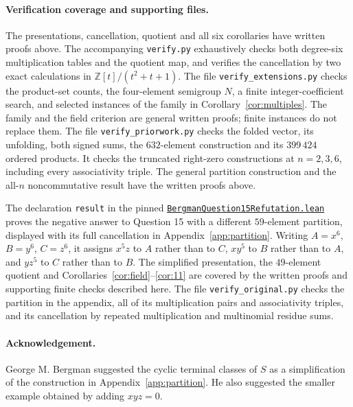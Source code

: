 \documentclass[11pt]{article}
\begin{document}
\paragraph{Verification coverage and supporting files.}
The presentations, cancellation, quotient and all six corollaries have
written proofs above. The accompanying \texttt{verify.py} exhaustively checks
both degree-six multiplication tables and the quotient map, and verifies
the cancellation by two exact calculations in $\mathbb Z[t]/(t^2+t+1)$.
The file \texttt{verify\_extensions.py} checks the product-set counts,
the four-element semigroup $N$, a finite integer-coefficient search, and
selected instances of the family in Corollary~\ref{cor:multiples}.
The family and the field criterion are general written proofs; finite
instances do not replace them.
The file \texttt{verify\_priorwork.py} checks the folded vector, its
unfolding, both signed sums, the $632$-element construction and its
$399\,424$ ordered products. It checks the truncated right-zero
constructions at $n=2,3,6$, including every associativity triple.
The general partition construction and the all-$n$ noncommutative
result have the written proofs above.

The declaration \texttt{result} in the pinned
\href{https://github.com/the-omega-institute/trureturing/blob/72243b116c47bc4fee2838e6b95fbab9802ed050/D5/S0/Certificates/Algebra/BergmanQuestion15Refutation.lean}{\texttt{BergmanQuestion15Refutation.lean}}
proves the negative answer to Question 15 with a different $59$-element
partition, displayed with its full cancellation in Appendix~\ref{app:partition}.
Writing $A=x^6$, $B=y^6$, $C=z^6$, it assigns $x^5z$ to $A$
rather than to $C$, $xy^5$ to $B$ rather than to $A$, and $yz^5$ to $C$
rather than to $B$. The simplified presentation, the $49$-element quotient
and Corollaries~\ref{cor:field}--\ref{cor:11} are covered by the written
proofs and supporting finite checks described here.
The file \texttt{verify\_original.py} checks the partition in the appendix,
all of its multiplication pairs and associativity triples, and its
cancellation by repeated multiplication and multinomial residue sums.

\paragraph{Acknowledgement.}
George M. Bergman suggested the cyclic terminal classes of $S$ as a
simplification of the construction in Appendix~\ref{app:partition}.
He also suggested the smaller example obtained by adding $xyz=0$.
\end{document}
